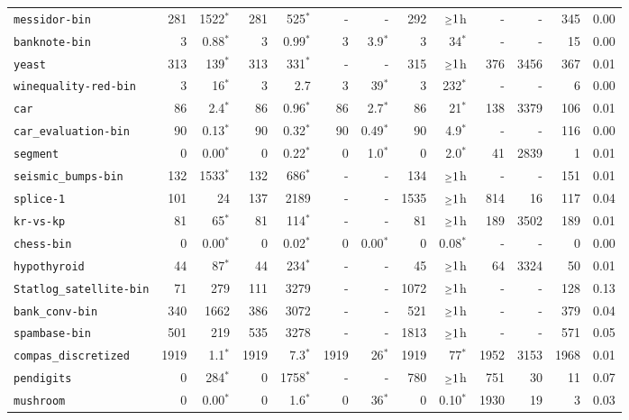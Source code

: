 \begin{tabular}{lrrrrrrrrrrrr}
\texttt{messidor-bin} & 281 & 1522$^*$ & 281 & 525$^*$ & - & - & 292 & $\mathsmaller{\geq}1$h & - & - & 345 & 0.00\\
\texttt{banknote-bin} & 3 & 0.88$^*$ & 3 & 0.99$^*$ & 3 & 3.9$^*$ & 3 & 34$^*$ & - & - & 15 & 0.00\\
\texttt{yeast} & 313 & 139$^*$ & 313 & 331$^*$ & - & - & 315 & $\mathsmaller{\geq}1$h & 376 & 3456 & 367 & 0.01\\
\texttt{winequality-red-bin} & 3 & 16$^*$ & 3 & 2.7 & 3 & 39$^*$ & 3 & 232$^*$ & - & - & 6 & 0.00\\
\texttt{car} & 86 & 2.4$^*$ & 86 & 0.96$^*$ & 86 & 2.7$^*$ & 86 & 21$^*$ & 138 & 3379 & 106 & 0.01\\
\texttt{car\_evaluation-bin} & 90 & 0.13$^*$ & 90 & 0.32$^*$ & 90 & 0.49$^*$ & 90 & 4.9$^*$ & - & - & 116 & 0.00\\
\texttt{segment} & 0 & 0.00$^*$ & 0 & 0.22$^*$ & 0 & 1.0$^*$ & 0 & 2.0$^*$ & 41 & 2839 & 1 & 0.01\\
\texttt{seismic\_bumps-bin} & 132 & 1533$^*$ & 132 & 686$^*$ & - & - & 134 & $\mathsmaller{\geq}1$h & - & - & 151 & 0.01\\
\texttt{splice-1} & 101 & 24 & 137 & 2189 & - & - & 1535 & $\mathsmaller{\geq}1$h & 814 & 16 & 117 & 0.04\\
\texttt{kr-vs-kp} & 81 & 65$^*$ & 81 & 114$^*$ & - & - & 81 & $\mathsmaller{\geq}1$h & 189 & 3502 & 189 & 0.01\\
\texttt{chess-bin} & 0 & 0.00$^*$ & 0 & 0.02$^*$ & 0 & 0.00$^*$ & 0 & 0.08$^*$ & - & - & 0 & 0.00\\
\texttt{hypothyroid} & 44 & 87$^*$ & 44 & 234$^*$ & - & - & 45 & $\mathsmaller{\geq}1$h & 64 & 3324 & 50 & 0.01\\
\texttt{Statlog\_satellite-bin} & 71 & 279 & 111 & 3279 & - & - & 1072 & $\mathsmaller{\geq}1$h & - & - & 128 & 0.13\\
\texttt{bank\_conv-bin} & 340 & 1662 & 386 & 3072 & - & - & 521 & $\mathsmaller{\geq}1$h & - & - & 379 & 0.04\\
\texttt{spambase-bin} & 501 & 219 & 535 & 3278 & - & - & 1813 & $\mathsmaller{\geq}1$h & - & - & 571 & 0.05\\
\texttt{compas\_discretized} & 1919 & 1.1$^*$ & 1919 & 7.3$^*$ & 1919 & 26$^*$ & 1919 & 77$^*$ & 1952 & 3153 & 1968 & 0.01\\
\texttt{pendigits} & 0 & 284$^*$ & 0 & 1758$^*$ & - & - & 780 & $\mathsmaller{\geq}1$h & 751 & 30 & 11 & 0.07\\
\texttt{mushroom} & 0 & 0.00$^*$ & 0 & 1.6$^*$ & 0 & 36$^*$ & 0 & 0.10$^*$ & 1930 & 19 & 3 & 0.03\\

\end{tabular}
